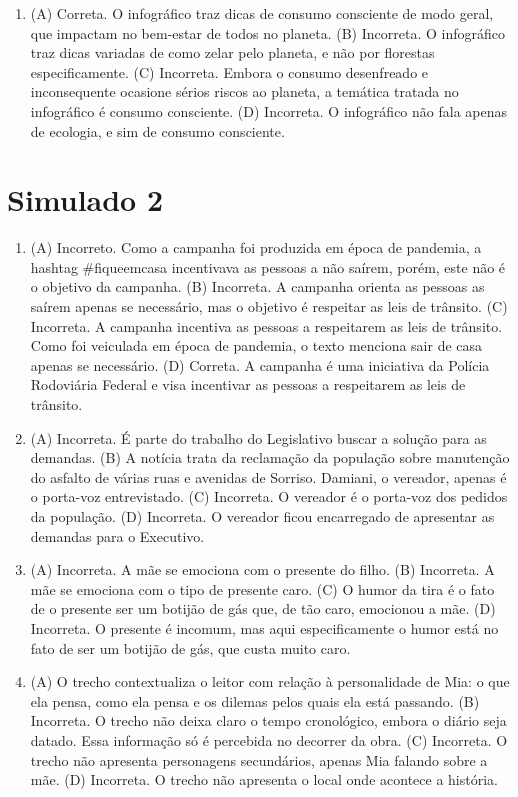 \begin{enumerate}
\item (A) Correta. O infográfico traz dicas de consumo consciente de modo
geral, que impactam no bem-estar de todos no planeta.
(B) Incorreta. O infográfico traz dicas variadas de como zelar pelo
planeta, e não por florestas especificamente.
(C) Incorreta. Embora o consumo desenfreado e inconsequente ocasione
sérios riscos ao planeta, a temática tratada no infográfico é consumo
consciente.
(D) Incorreta. O infográfico não fala apenas de ecologia, e sim de
consumo consciente.
\end{enumerate}

\section*{Simulado 2}

\begin{enumerate}
\item (A) Incorreto. Como a campanha foi produzida em época de pandemia, a
hashtag \#fiqueemcasa incentivava as pessoas a não saírem, porém, este
não é o objetivo da campanha.
(B) Incorreta. A campanha orienta as pessoas as saírem apenas se
necessário, mas o objetivo é respeitar as leis de trânsito.
(C) Incorreta. A campanha incentiva as pessoas a respeitarem as leis de
trânsito. Como foi veiculada em época de pandemia, o texto menciona sair
de casa apenas se necessário.
(D) Correta. A campanha é uma iniciativa da Polícia Rodoviária Federal e
visa incentivar as pessoas a respeitarem as leis de trânsito.

\item (A) Incorreta. É parte do trabalho do Legislativo buscar a solução para
as demandas.
(B) A notícia trata da reclamação da população sobre manutenção do
asfalto de várias ruas e avenidas de Sorriso. Damiani, o vereador,
apenas é o porta-voz entrevistado.
(C) Incorreta. O vereador é o porta-voz dos pedidos da população.
(D) Incorreta. O vereador ficou encarregado de apresentar as demandas
para o Executivo.

\item (A) Incorreta. A mãe se emociona com o presente do filho.
(B) Incorreta. A mãe se emociona com o tipo de presente caro.
(C) O humor da tira é o fato de o presente ser um botijão de gás que, de
tão caro, emocionou a mãe.
(D) Incorreta. O presente é incomum, mas aqui especificamente o humor
está no fato de ser um botijão de gás, que custa muito caro.

\item (A) O trecho contextualiza o leitor com relação à personalidade de Mia: o
que ela pensa, como ela pensa e os dilemas pelos quais ela está
passando.
(B) Incorreta. O trecho não deixa claro o tempo cronológico, embora o
diário seja datado. Essa informação só é percebida no decorrer da obra.
(C) Incorreta. O trecho não apresenta personagens secundários, apenas Mia
falando sobre a mãe.
(D) Incorreta. O trecho não apresenta o local onde acontece a história.


\end{enumerate}
